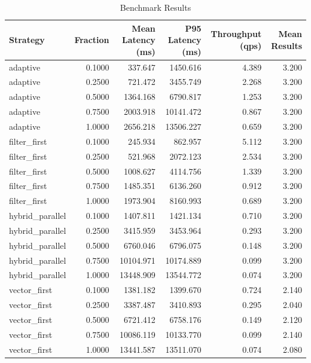 \begin{table}[ht]
\centering
\begin{tabular}{lrrrrr}
\hline
Strategy & Fraction & Mean Latency (ms) & P95 Latency (ms) & Throughput (qps) & Mean Results \\
\hline
adaptive & 0.1000 & 337.647 & 1450.616 & 4.389 & 3.200 \\
adaptive & 0.2500 & 721.472 & 3455.749 & 2.268 & 3.200 \\
adaptive & 0.5000 & 1364.168 & 6790.817 & 1.253 & 3.200 \\
adaptive & 0.7500 & 2003.918 & 10141.472 & 0.867 & 3.200 \\
adaptive & 1.0000 & 2656.218 & 13506.227 & 0.659 & 3.200 \\
filter_first & 0.1000 & 245.934 & 862.957 & 5.112 & 3.200 \\
filter_first & 0.2500 & 521.968 & 2072.123 & 2.534 & 3.200 \\
filter_first & 0.5000 & 1008.627 & 4114.756 & 1.339 & 3.200 \\
filter_first & 0.7500 & 1485.351 & 6136.260 & 0.912 & 3.200 \\
filter_first & 1.0000 & 1973.904 & 8160.993 & 0.689 & 3.200 \\
hybrid_parallel & 0.1000 & 1407.811 & 1421.134 & 0.710 & 3.200 \\
hybrid_parallel & 0.2500 & 3415.959 & 3453.964 & 0.293 & 3.200 \\
hybrid_parallel & 0.5000 & 6760.046 & 6796.075 & 0.148 & 3.200 \\
hybrid_parallel & 0.7500 & 10104.971 & 10174.889 & 0.099 & 3.200 \\
hybrid_parallel & 1.0000 & 13448.909 & 13544.772 & 0.074 & 3.200 \\
vector_first & 0.1000 & 1381.182 & 1399.670 & 0.724 & 2.140 \\
vector_first & 0.2500 & 3387.487 & 3410.893 & 0.295 & 2.040 \\
vector_first & 0.5000 & 6721.412 & 6758.176 & 0.149 & 2.120 \\
vector_first & 0.7500 & 10086.119 & 10133.770 & 0.099 & 2.140 \\
vector_first & 1.0000 & 13441.587 & 13511.070 & 0.074 & 2.080 \\
\hline
\end{tabular}
\caption{Benchmark Results}
\end{table}